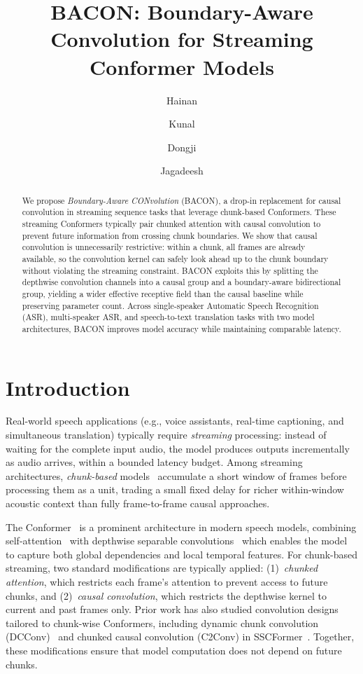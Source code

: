 \documentclass[cameraready]{Interspeech}
\title{BACON: Boundary-Aware Convolution for Streaming Conformer Models}
\author{Hainan}{Xu}
\author{Kunal}{Dhawan}
\author{Dongji}{Gao}
\author{Jagadeesh}{Balam}
\begin{document}
\maketitle

\begin{abstract}
We propose \emph{Boundary-Aware CONvolution} (BACON), a drop-in replacement for causal convolution in streaming sequence tasks that leverage chunk-based Conformers.
These streaming Conformers typically pair chunked attention with
causal convolution to prevent future information from crossing chunk
boundaries. We show that
causal convolution is unnecessarily restrictive: within a chunk, all frames
are already available, so the convolution kernel can safely look ahead up to
the chunk boundary without violating the streaming constraint.
BACON exploits
this by splitting the depthwise convolution channels into a causal group and a
boundary-aware bidirectional group, yielding a wider effective receptive field
than the causal baseline while preserving parameter count.
Across single-speaker Automatic Speech Recognition (ASR), multi-speaker ASR, and speech-to-text translation tasks with two model architectures,
BACON improves model accuracy while maintaining comparable latency.

\end{abstract}

\section{Introduction}
\label{sec:intro}

Real-world speech applications (e.g., voice assistants, real-time captioning,
and simultaneous translation) typically require \emph{streaming} processing:
instead of waiting for the complete input audio, the model produces outputs
incrementally as
audio arrives, within a bounded latency budget. 
Among streaming architectures,
\emph{chunk-based} models~\cite{chen2021developing} accumulate a short window
of frames before processing them as a unit, trading a small fixed delay for
richer within-window acoustic context than fully frame-to-frame causal approaches.

The Conformer~\cite{gulati2020conformer,rekesh2023fast} is a prominent architecture in modern
speech models, combining self-attention~\cite{vaswani2017attention} with
depthwise separable convolutions~\cite{kaiser2017depthwise} which enables the model to capture both global dependencies and local temporal features.
For chunk-based streaming, two standard modifications are typically applied: (1)~\emph{chunked
attention}, which restricts each frame's attention
to prevent access to future chunks, and (2)~\emph{causal convolution}, which
restricts the depthwise kernel to current and past frames only.
Prior work has also studied convolution designs tailored to chunk-wise
Conformers, including dynamic chunk convolution (DCConv)~\cite{li2023dynamic}
and chunked causal convolution (C2Conv) in SSCFormer~\cite{chunkssscformer}.
Together, these modifications ensure that model computation does not depend on future chunks.
\end{document}
